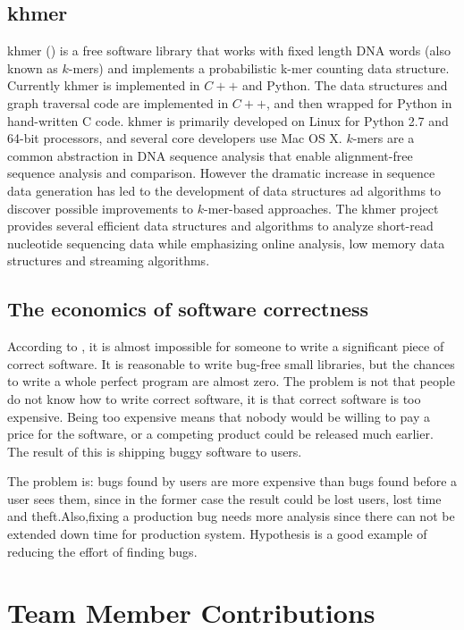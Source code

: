 \documentclass[preprint,nocopyrightspace]{sig-alternate}
\begin{document}
\subsection{khmer}
khmer (\citet{crusoe_khmer_2015}) is a free software library that works with fixed length DNA words (also known as $k$-mers) and implements a probabilistic k-mer counting data structure.
Currently khmer is implemented in $C++$ and Python.
The data structures and graph traversal code are implemented in $C++$,
and then wrapped for Python in hand-written C code.
khmer is primarily developed on Linux for Python 2.7 and 64-bit processors,
and several core developers use Mac OS X.
$k$-mers are a common abstraction in DNA sequence analysis that enable alignment-free sequence analysis and comparison.
However the dramatic increase in sequence data generation has led to the development of data structures ad algorithms to discover possible improvements to $k$-mer-based approaches.
The khmer project provides several efficient data structures and algorithms to analyze short-read nucleotide sequencing data while emphasizing online analysis,
low memory data structures and streaming algorithms.

\subsection{The economics of software correctness}
According to \citet{maciver_economics_2015},
it is almost impossible for someone to write a significant piece of correct software.
It is reasonable to write bug-free small libraries,
but the chances to write a whole perfect program are almost zero.
The problem is not that people do not know how to write correct software,
it is that correct software is too expensive.
Being too expensive means that nobody would be willing to pay a price for the software,
or a competing product could be released much earlier.
The result of this is shipping buggy software to users.

The problem is:
bugs found by users are more expensive than bugs found before a user sees them,
since in the former case the result could be lost users,
lost time and theft.Also,fixing a production bug needs more analysis since 
there can not be extended down time for production system.
Hypothesis is a good example of reducing the effort of finding bugs.

\section{Team Member Contributions}
\end{document}
